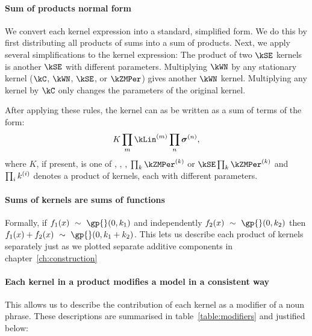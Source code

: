 \paragraph{Sum of products normal form} 

We convert each kernel expression into a standard, simplified form.
We do this by first distributing all products of sums into a sum of products.
Next, we apply several simplifications to the kernel expression:
The product of two $\kSE$ kernels is another $\kSE$ with different parameters. Multiplying $\kWN$ by any stationary kernel ($\kC$, $\kWN$, $\kSE$, or $\kZMPer$) gives another $\kWN$ kernel. Multiplying any kernel by $\kC$ only changes the parameters of the original kernel.

After applying these rules, the kernel can as be written as a sum of terms of the form:
\begin{align*}
K \prod_m \kLin^{(m)} \prod_n \boldsymbol\sigma^{(n)},
\label{eq:sop}
\end{align*}
where $K$, if present, is one of \kWN, \kC, \kSE, $\prod_k \kZMPer^{(k)}$ or $\kSE \prod_k \kZMPer^{(k)}$
and $\prod_ik^{(i)}$ denotes a product of kernels, each with different parameters.


\paragraph{Sums of kernels are sums of functions}
Formally, if $f_1(x) \dist \gp{}(0, \kernel_1)$ and independently $f_2(x) \dist \gp{}(0, \kernel_2)$ then ${f_1(x) + f_2(x) \dist \gp{}(0, \kernel_1 + \kernel_2)}$.
This lets us describe each product of kernels separately just as we plotted separate additive components in chapter~\ref{ch:construction}

\paragraph{Each kernel in a product modifies a model in a consistent way}
This allows us to describe the contribution of each kernel as a modifier of a noun phrase.
These descriptions are summarised in table~\ref{table:modifiers} and justified below:

